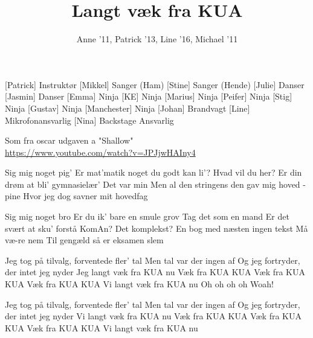 \documentclass[a4paper,11pt]{article}
\title{Langt væk fra KUA}
\author{Anne '11, Patrick '13, Line '16, Michael '11}
\begin{document}
\maketitle

\begin{roles}
[Patrick] Instruktør
[Mikkel] Sanger (Ham)
[Stine] Sanger (Hende)
[Julie] Danser
[Jasmin] Danser
[Emma] Ninja
[KE] Ninja
[Marius] Ninja
[Peifer] Ninja
[Stig] Ninja
[Gustav] Ninja
[Manchester] Ninja
[Johan] Brandvagt
[Line] Mikrofonansvarlig
[Nina] Backstage Ansvarlig
\end{roles}

\begin{props}
     Som fra oscar udgaven a "Shallow" \\ \url{https://www.youtube.com/watch?v=JPJjwHAIny4}
\end{props}

\begin{song}
 Sig mig noget pig'
Er mat'matik noget du godt kan li'?
Hvad vil du her?
Er din drøm at bli' gymnasielær'
Det var min
Men al den stringens den gav mig
hoved - pine
Hvor jeg dog savner mit hovedfag

 Sig mig noget bro
Er du ik' bare en smule grov
Tag det som en mand
Er det svært at sku' forstå KomAn?
 Det komplekst?
 En bog med næsten ingen tekst
Må væ-re nem
 Til gengæld så er eksamen slem

 Jeg tog på tilvalg, forventede fler' tal
Men tal var der ingen af
Og jeg fortryder, der intet jeg nyder
Jeg langt væk fra KUA nu
Væk fra KUA KUA
Væk fra KUA KUA
Væk fra KUA KUA
Vi langt væk fra KUA nu
Oh oh oh oh
Woah!

 Jeg tog på tilvalg, forventede fler' tal
Men tal var der ingen af
Og jeg fortryder, der intet jeg nyder
Vi langt væk fra KUA nu
Væk fra KUA KUA
Væk fra KUA KUA
Væk fra KUA KUA
Vi langt væk fra KUA nu
\end{song}
\end{document}
